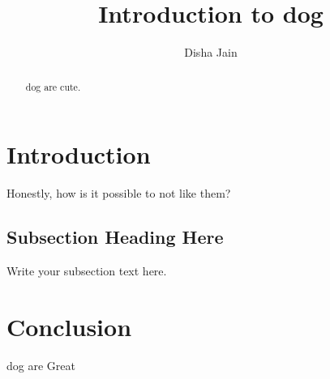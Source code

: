 \documentclass{article}
\begin{document}
\title{Introduction to dog}
\author{Disha Jain}

\maketitle

\begin{abstract}
dog are cute.
\end{abstract}

\section{Introduction}
Honestly, how is it possible to not like them?

\subsection{Subsection Heading Here}
Write your subsection text here.

\section{Conclusion}
dog are Great
\end{document}
